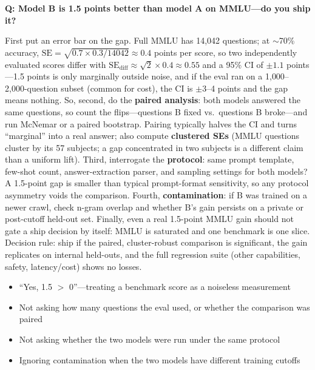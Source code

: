 \begin{interviewq}
\textbf{Q: Model B is 1.5 points better than model A on MMLU---do you ship it?}

 \quad {} \quad \badgefreq{\freqhigh}

\stronganswer First put an error bar on the gap. Full MMLU has 14{,}042 questions; at $\sim$70\% accuracy, $\text{SE} = \sqrt{0.7 \times 0.3 / 14042} \approx 0.4$ points per score, so two independently evaluated scores differ with $\text{SE}_{\text{diff}} \approx \sqrt{2} \times 0.4 \approx 0.55$ and a 95\% CI of $\pm 1.1$ points---1.5 points is only marginally outside noise, and if the eval ran on a 1{,}000--2{,}000-question subset (common for cost), the CI is $\pm 3$--4 points and the gap means nothing. So, second, do the \textbf{paired analysis}: both models answered the same questions, so count the flips---questions B fixed vs.\ questions B broke---and run McNemar or a paired bootstrap. Pairing typically halves the CI and turns ``marginal'' into a real answer; also compute \textbf{clustered SEs} (MMLU questions cluster by its 57 subjects; a gap concentrated in two subjects is a different claim than a uniform lift). Third, interrogate the \textbf{protocol}: same prompt template, few-shot count, answer-extraction parser, and sampling settings for both models? A 1.5-point gap is smaller than typical prompt-format sensitivity, so any protocol asymmetry voids the comparison. Fourth, \textbf{contamination}: if B was trained on a newer crawl, check n-gram overlap and whether B's gain persists on a private or post-cutoff held-out set. Finally, even a real 1.5-point MMLU gain should not gate a ship decision by itself: MMLU is saturated and one benchmark is one slice. Decision rule: ship if the paired, cluster-robust comparison is significant, the gain replicates on internal held-outs, and the full regression suite (other capabilities, safety, latency/cost) shows no losses.

\redflags
\begin{itemize}
    \item ``Yes, 1.5 $>$ 0''---treating a benchmark score as a noiseless measurement
    \item Not asking how many questions the eval used, or whether the comparison was paired
    \item Not asking whether the two models were run under the same protocol
    \item Ignoring contamination when the two models have different training cutoffs
\end{itemize}


\end{interviewq}
